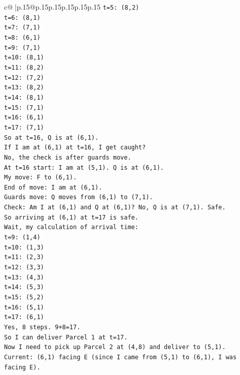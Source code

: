 \documentclass{article}
\begin{document}
{\begin{supertabular}{c@{$\;$}|p{.15\linewidth}@{}p{.15\linewidth}p{.15\linewidth}p{.15\linewidth}p{.15\linewidth}p{.15\linewidth}}
{{{\texttt{t=5: (8,2)} \\
\texttt{t=6: (8,1)} \\
\texttt{t=7: (7,1)} \\
\texttt{t=8: (6,1)} \\
\texttt{t=9: (7,1)} \\
\texttt{t=10: (8,1)} \\
\texttt{t=11: (8,2)} \\
\texttt{t=12: (7,2)} \\
\texttt{t=13: (8,2)} \\
\texttt{t=14: (8,1)} \\
\texttt{t=15: (7,1)} \\
\texttt{t=16: (6,1)} \\
\texttt{t=17: (7,1)} \\
\texttt{So at t=16, Q is at (6,1).} \\
\texttt{If I am at (6,1) at t=16, I get caught?} \\
\texttt{No, the check is after guards move.} \\
\texttt{At t=16 start: I am at (5,1). Q is at (6,1).} \\
\texttt{My move: F to (6,1).} \\
\texttt{End of move: I am at (6,1).} \\
\texttt{Guards move: Q moves from (6,1) to (7,1).} \\
\texttt{Check: Am I at (6,1) and Q at (6,1)? No, Q is at (7,1). Safe.} \\
\texttt{So arriving at (6,1) at t=17 is safe.} \\
\texttt{Wait, my calculation of arrival time:} \\
\texttt{t=9: (1,4)} \\
\texttt{t=10: (1,3)} \\
\texttt{t=11: (2,3)} \\
\texttt{t=12: (3,3)} \\
\texttt{t=13: (4,3)} \\
\texttt{t=14: (5,3)} \\
\texttt{t=15: (5,2)} \\
\texttt{t=16: (5,1)} \\
\texttt{t=17: (6,1)} \\
\texttt{Yes, 8 steps. 9+8=17.} \\
\texttt{So I can deliver Parcel 1 at t=17.} \\
\texttt{Now I need to pick up Parcel 2 at (4,8) and deliver to (5,1).} \\
\texttt{Current: (6,1) facing E (since I came from (5,1) to (6,1), I was facing E).} \\
}}}
\end{supertabular}}
\end{document}
